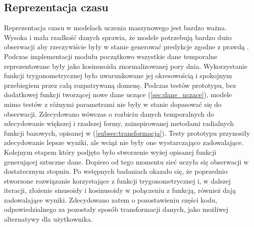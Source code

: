 \subsection{Reprezentacja czasu} \label{subsec:reprezentacja_czasu}
Reprezentacja czasu w modelach uczenia maszynowego jest bardzo ważna. Wysoka i mała rzadkość danych sprawia, że modele potrzebują bardzo dużo obserwacji aby rzeczywiście były w stanie generować predykcje zgodne z prawdą \cite{curse_of_dimensionality}. Podczas implementacji modułu początkowo wszystkie dane temporalne reprezentowane były jako kosinusoida znormalizowanej pory dnia. Wykorzystanie funkcji trygonometrycznej było uwarunkowane jej okresowością i spokojnym przebiegiem przez całą rozpatrywaną domenę. Podczas testów prototypu, bez dodatkowej funkcji tworzącej nowe dane uczące (\ref{sec:dane_uczace}), modele mimo testów z różnymi parametrami nie były w stanie dopasować się do obserwacji. Zdecydowano wówczas o rozbiciu danych temporalnych do zdecydowanie większej i rzadszej formy, zainspirowanej metodami radialnych funkcji bazowych, opisanej w (\ref{subsec:transformacja}). Testy prototypu przynosiły zdecydowanie lepsze wyniki, ale wciąż nie były one wystarczająco zadowalające. Kolejnym etapem który podjęto było stworzenie wyżej opisanej funkcji generującej sztuczne dane. Dopiero od tego momentu sieć uczyła się obserwacji w dostatecznym stopniu. Po wstępnych badaniach okazało się, że poprzednio stworzone rozwiązanie korzystające z funkcji trygonometrycznej i, w dalszej iteracji, złożenie sinusoidy i kosinusoidy w połączeniu z funkcją, również dają zadowalające wyniki. Zdecydowano zatem o pozostawieniu części kodu, odpowiedzialnego za pozostały sposób transformacji danych, jako możliwej alternatywy dla użytkownika.

